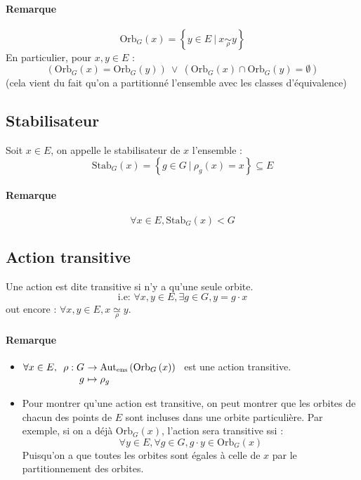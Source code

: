 \documentclass[a4paper,10pt]{report}
\newcommand{\set}[1]{\left\lbrace #1 \right\rbrace } %
\newcommand{\mfootnote}[1]{\up{(}\footnote{#1}\up{)}}
\newcommand{\Autens}[1]{\text{Aut}_{\text{ens}}\left(#1\right)}
\newcommand{\Orb}[2]{\text{Orb}_{#1}\left( #2 \right)}
\newcommand{\Stab}[2]{\text{Stab}_{#1}\left( #2 \right)}
\newcommand{\such}{\ \Big| \ }
\begin{document}
    \paragraph{Remarque}
    $$\Orb{G}{x}=\set{y \in E \such x \underset{\rho}{\sim} y}$$
    En particulier, pour $x, y \in E$ : $$\left( \Orb{G}{x}=\Orb{G}{y} \right)
    \ \lor \ \left( \Orb{G}{x} \cap \Orb{G}{y}= \emptyset \right)$$
    (cela vient du fait qu'on a partitionné l'ensemble avec les classes
    d'équivalence)

   \subsection{Stabilisateur}
    Soit $x \in E$, on appelle le stabilisateur de $x$ l'ensemble :
    $$\Stab{G}{x} = \set{g\in G \such \rho_g(x)= x} \subseteq E$$

    \paragraph{Remarque}
    \begin{comment}
      \mfootnote{Preuve : 26/11/08 p2}
    \end{comment}
    $$\forall x \in E, \Stab{G}{x} < G$$

   \subsection{Action transitive}
    Une action est dite transitive si n'y a qu'une seule orbite.
    $$\text{i.e: } \forall x, y \in E, \exists g \in G, y=g \cdot x$$
    out encore : $\forall x,y \in E, x \underset{\rho}{\simeq} y$.
    \paragraph{Remarque}
    \begin{itemize}
      \item $\forall x \in E,
	\begin{array}[t]{r@{\ }l}
          \rho:G & \to \Autens{\Orb{G}{x}}\\
          g & \mapsto \rho_g
        \end{array}$ est une action transitive.
      \item Pour montrer qu'une action est transitive, on peut montrer que les
        orbites de chacun des points de $E$ sont incluses dans une orbite
        particulière. Par exemple, si on a déjà $\Orb{G}{x}$, l'action sera
        transitive ssi :
        $$\forall y \in E, \forall g \in G, g\cdot y \in \Orb{G}{x}$$
        Puisqu'on a que toutes les orbites sont égales à celle de $x$ par le
        partitionnement des orbites.
    \end{itemize}
 
\end{document}
